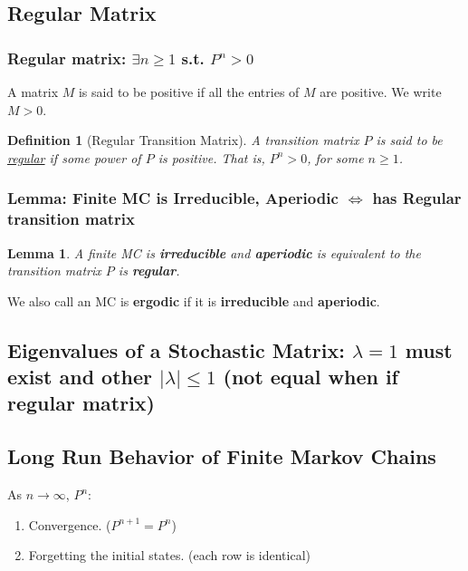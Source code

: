 \documentclass[11pt,a4paper]{article}
\newtheorem{definition}{Definition}
\newtheorem{lemma}{Lemma}
\begin{document}
\subsection{Regular Matrix}
\subsubsection{Regular matrix: $\exists n\geq 1$ s.t. $P^n>0$}
A matrix $M$ is said to be positive if all the entries of $M$ are positive. We write $M > 0$.
\begin{definition}[Regular Transition Matrix]
    A transition matrix $P$ is said to be \underline{regular} if some power of $P$ is positive. That is, $P^n >0$, for some $n\geq 1$.
\end{definition}

\subsubsection{Lemma: Finite MC is Irreducible, Aperiodic $\Leftrightarrow$ has Regular transition matrix}
\begin{lemma}
    A finite MC is \textbf{irreducible} and \textbf{aperiodic} is equivalent to the transition matrix $P$ is \textbf{regular}.
\end{lemma}

We also call an MC is \textbf{ergodic} if it is \textbf{irreducible} and \textbf{aperiodic}.

\subsection{Eigenvalues of a Stochastic Matrix: $\lambda=1$ must exist and other $|\lambda|\leq 1$ (not equal when if regular matrix)}
\begin{center}
\end{center}

\subsection{Long Run Behavior of Finite Markov Chains}
As $n \rightarrow \infty$, $P^n$:
\begin{enumerate}[(1)]
    \item Convergence. ($P^{n+1}=P^n$)
    \item Forgetting the initial states. (each row is identical)
\end{enumerate}
\end{document}
